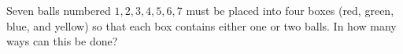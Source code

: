 Seven balls numbered $1, 2, 3, 4, 5, 6, 7$ must be placed into four boxes (red, green, blue, and yellow) so that each box contains either one or two balls. In how many ways can this be done?
